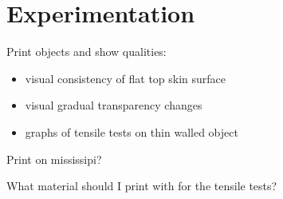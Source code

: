 \section{Experimentation}
Print objects and show qualities:
\begin{itemize}
\item visual consistency of flat top skin surface
\item visual gradual transparency changes
\item graphs of tensile tests on thin walled object
\end{itemize}

Print on mississipi?

What material should I print with for the tensile tests?









